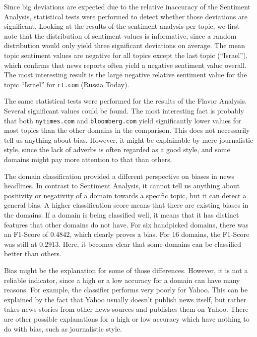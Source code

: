 \documentclass[final]{ieee}
\begin{document}
Since big deviations are expected due to the relative inaccuracy of the Sentiment Analysis, statistical tests were performed to detect whether those deviations are significant. Looking at the results of the sentiment analysis per topic, we first note that the distribution of sentiment values is informative, since a random distribution would only yield three significant deviations on average. The mean topic sentiment values are negative for all topics except the last topic (``Israel''), which confirms that news reports often yield a negative sentiment value overall. The most interesting result is the large negative relative sentiment value for the topic ``Israel'' for \texttt{rt.com} (Russia Today).

The same statistical tests were performed for the results of the Flavor Analysis. Several significant values could be found. The most interesting fact is probably that both \texttt{nytimes.com} and \texttt{bloomberg.com} yield significantly lower values for most topics than the other domains in the comparison. This does not necessarily tell us anything about bias. However, it might be explainable by mere journalistic style, since the lack of adverbs is often regarded as a good style, and some domains might pay more attention to that than others.

The domain classification provided a different perspective on biases in news headlines. In contrast to Sentiment Analysis, it cannot tell us anything about positivity or negativity of a domain towards a specific topic, but it can detect a general bias. A higher classification score means that there are existing biases in the domains. If a domain is being classified well, it means that it has distinct features that other domains do not have. For six handpicked domains, there was an F1-Score of $0.4842$, which clearly proves a bias. For 16 domains, the F1-Score was still at $0.2913$. Here, it becomes clear that some domains can be classified better than others.

Bias might be the explanation for some of those differences. However, it is not a reliable indicator, since a high or a low accuracy for a domain can have many reasons. For example, the classifier performs very poorly for Yahoo. This can be explained by the fact that Yahoo usually doesn't publish news itself, but rather takes news stories from other news sources and publishes them on Yahoo. There are other possible explanations for a high or low accuracy which have nothing to do with bias, such as journalistic style.
\end{document}
